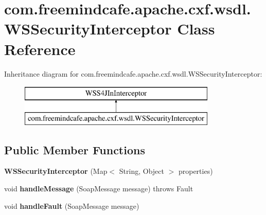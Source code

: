 \hypertarget{classcom_1_1freemindcafe_1_1apache_1_1cxf_1_1wsdl_1_1_w_s_security_interceptor}{}\section{com.\+freemindcafe.\+apache.\+cxf.\+wsdl.\+W\+S\+Security\+Interceptor Class Reference}
\label{classcom_1_1freemindcafe_1_1apache_1_1cxf_1_1wsdl_1_1_w_s_security_interceptor}
Inheritance diagram for com.\+freemindcafe.\+apache.\+cxf.\+wsdl.\+W\+S\+Security\+Interceptor\+:\begin{figure}[H]
\begin{center}
\leavevmode
\includegraphics[height=2.000000cm]{classcom_1_1freemindcafe_1_1apache_1_1cxf_1_1wsdl_1_1_w_s_security_interceptor}
\end{center}
\end{figure}
\subsection*{Public Member Functions}
\begin{DoxyCompactItemize}
\item 
\hypertarget{classcom_1_1freemindcafe_1_1apache_1_1cxf_1_1wsdl_1_1_w_s_security_interceptor_aaa02b8d0ad3947f4ad83787d5007bb3d}{}{\bfseries W\+S\+Security\+Interceptor} (Map$<$ String, Object $>$ properties)\label{classcom_1_1freemindcafe_1_1apache_1_1cxf_1_1wsdl_1_1_w_s_security_interceptor_aaa02b8d0ad3947f4ad83787d5007bb3d}

\item 
\hypertarget{classcom_1_1freemindcafe_1_1apache_1_1cxf_1_1wsdl_1_1_w_s_security_interceptor_aa41dc95184add32b64bdad0216b9c0d1}{}void {\bfseries handle\+Message} (Soap\+Message message)  throws Fault \label{classcom_1_1freemindcafe_1_1apache_1_1cxf_1_1wsdl_1_1_w_s_security_interceptor_aa41dc95184add32b64bdad0216b9c0d1}

\item 
\hypertarget{classcom_1_1freemindcafe_1_1apache_1_1cxf_1_1wsdl_1_1_w_s_security_interceptor_acbaff10e275b03aa8354c8fe4e2236d4}{}void {\bfseries handle\+Fault} (Soap\+Message message)\label{classcom_1_1freemindcafe_1_1apache_1_1cxf_1_1wsdl_1_1_w_s_security_interceptor_acbaff10e275b03aa8354c8fe4e2236d4}

\end{DoxyCompactItemize}
